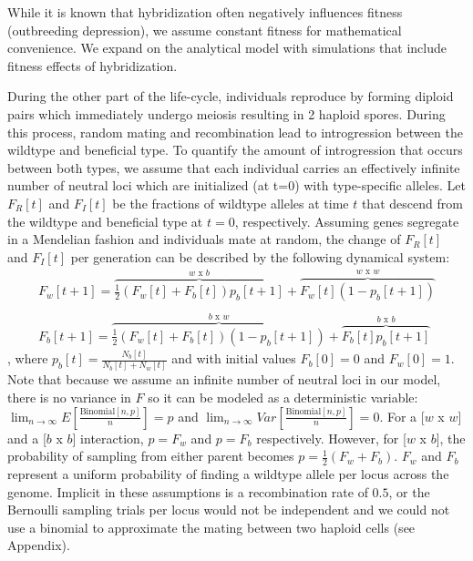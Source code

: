 \documentclass[a4paper,10pt]{article}
\begin{document}
While it is known that hybridization often negatively influences fitness (outbreeding depression), we assume constant fitness for mathematical convenience. We expand on the analytical model with simulations that include fitness effects of hybridization.

During the other part of the life-cycle, individuals reproduce by forming diploid pairs which immediately undergo meiosis resulting in 2 haploid spores. During this process, random mating and recombination lead to introgression between the wildtype and beneficial type. To quantify the amount of introgression that occurs between both types, we assume that each individual carries an effectively infinite number of neutral loci which are initialized (at t=0) with type-specific alleles. Let $F_R[t]$ and $F_I[t]$ be the fractions of wildtype alleles at time $t$ that descend from the wildtype and beneficial type at $t=0$, respectively. Assuming genes segregate in a Mendelian fashion and individuals mate at random, the change of $F_R[t]$ and $F_I[t]$ per generation can be described by the following dynamical system: 
	\begin{equation}
    \begin{array}{l}
	F_w[t+1] = \overbrace{\frac{1}{2} (F_w[t]+F_b[t]) p_b[t+1]}^\text{$w$ x $b$}  + \overbrace{F_w[t] (1-p_b[t+1])}^\text{$w$ x $w$}
	 \\ \\
	F_b[t+1]  = \overbrace{\frac{1}{2} (F_w[t]+F_b[t]) (1-p_b[t+1])}^\text{$b$ x $w$} 
	+ \overbrace{F_b[t] p_b[t+1]}^\text{$b$ x $b$}
	\end{array}
	\end{equation}, 
where $p_b[t] = \frac{N_b[t]}{N_b[t]+N_w[t]}$ and with initial values $F_b[0]=0$ and $F_w[0]=1$. Note that because we assume an infinite number of neutral loci in our model, there is no variance in $F$ so it can be modeled as a deterministic variable: $\lim_{n \rightarrow \infty} E[\frac{\text{Binomial}[n,p]}{n}] = p$ and $\lim_{n \rightarrow \infty} Var[\frac{\text{Binomial}[n,p]}{n}] = 0 $. For a [$w$ x $w$] and a [$b$ x $b$] interaction, $p = F_w$ and $p = F_b$ respectively. However, for [$w$ x $b$], the probability of sampling from either parent becomes $p = \frac{1}{2} (F_w + F_b)$. $F_w$ and $F_b$ represent a uniform probability of finding a wildtype allele per locus across the genome. Implicit in these assumptions is a recombination rate of $0.5$, or the Bernoulli sampling trials per locus would not be independent and we could not use a binomial to approximate the mating between two haploid cells (see Appendix).
\end{document}
